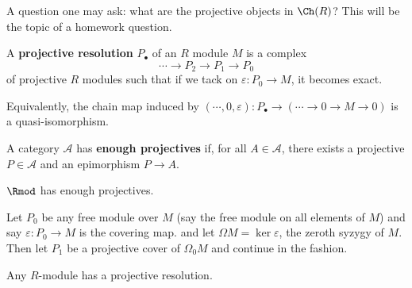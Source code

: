 \documentclass[12pt]{article}
\begin{document}
A question one may ask: what are the projective objects in $\Ch(R)$? This will be the topic of a homework 
question.
\begin{defn}
	A \textbf{projective resolution} $P_\bullet$ of an $R$ module $M$ is a complex
	\[\cdots\to P_2\to P_1\to P_0\]
	of projective $R$ modules such that if we tack on $\varepsilon:P_0\to M$, it becomes exact.

	Equivalently, the chain map induced by $(\cdots,0,\varepsilon):P_\bullet\to (\cdots\to 0\to M\to 0)$ 
	is a quasi-isomorphism.
\end{defn}
\begin{defn}
	A category $\mathcal A$ has \textbf{enough projectives} if, for all $A\in\mathcal A$, there exists
	a projective $P\in\mathcal A$ and an epimorphism $P\to A$.
\end{defn}
\begin{lem}
	$\Rmod$ has enough projectives.
\end{lem}
\begin{prf}
	Let $P_0$ be any free module over $M$ (say the free module on all elements of $M$) and say $\varepsilon:P_0\to M$ is the covering map.
	and let $\Omega M=\ker \varepsilon$, the zeroth syzygy of $M$. Then let $P_1$ be a projective cover of $\Omega_0M$
	and continue in the fashion.
\end{prf}
\begin{cor}
	Any $R$-module has a projective resolution.
\end{cor}
\end{document}
